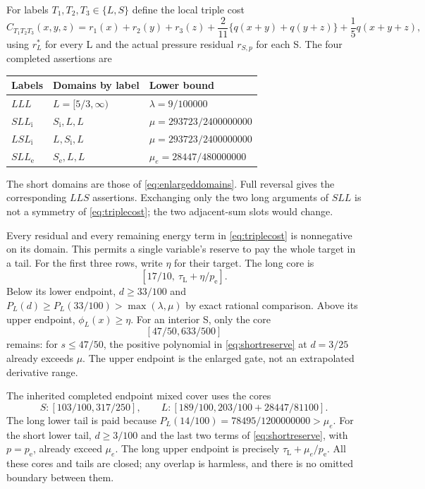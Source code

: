 \documentclass[11pt]{amsart}
\numberwithin{equation}{section}
\newcommand{\pe}{p_{\mathrm e}}
\newcommand{\tL}{\tau_{\mathrm L}}
\begin{document}
For labels $T_1,T_2,T_3\in\{L,S\}$ define the local triple cost
\begin{equation}\label{eq:triplecost}
 C_{T_1T_2T_3}(x,y,z)=r_1(x)+r_2(y)+r_3(z)
       +\frac2{11}\{q(x+y)+q(y+z)\}+\frac15q(x+y+z),
\end{equation}
using $r_L^*$ for every L and the actual pressure residual
$r_{S,p}$ for each S. The four completed assertions are
\begin{center}\small
\begin{tabular}{@{}lll@{}}
\toprule
Labels & Domains by label & Lower bound\\
\midrule
$LLL$ & $L=[5/3,\infty)$ & $\lambda=9/100000$\\
$SLL_{\mathrm i}$ & $S_{\mathrm i},L,L$ & $\mu=293723/2400000000$\\
$LSL_{\mathrm i}$ & $L,S_{\mathrm i},L$ & $\mu=293723/2400000000$\\
$SLL_{\mathrm e}$ & $S_{\mathrm e},L,L$ & $\mu_e=28447/480000000$\\
\bottomrule
\end{tabular}
\end{center}
The short domains are those of \eqref{eq:enlargeddomains}. Full
reversal gives the corresponding $LLS$ assertions. Exchanging only
the two long arguments of $SLL$ is not a symmetry of
\eqref{eq:triplecost}; the two adjacent-sum slots would change.

Every residual and every remaining energy term in
\eqref{eq:triplecost} is nonnegative on its domain. This permits a
single variable's reserve to pay the whole target in a tail. For
the first three rows, write $\eta$ for their target. The long core is
\begin{equation}\label{eq:newlongcore}
 [17/10,\ \tL+\eta/\pe].
\end{equation}
Below its lower endpoint, $d\geq33/100$ and
$P_L(d)\geq P_L(33/100)>\max(\lambda,\mu)$ by exact rational
comparison. Above its upper endpoint, $\phi_L(x)\geq\eta$.
For an interior S, only the core
\begin{equation}\label{eq:newshortcore}
 [47/50,633/500]
\end{equation}
remains: for $s\leq47/50$, the positive polynomial in
\eqref{eq:shortreserve} at $d=3/25$ already exceeds $\mu$.
The upper endpoint is the enlarged gate, not an extrapolated
derivative range.

The inherited completed endpoint mixed cover uses the cores
\begin{equation}\label{eq:endpointcores}
 S:[103/100,317/250],\qquad
 L:[189/100,203/100+28447/81100].
\end{equation}
The long lower tail is paid because
$P_L(14/100)=78495/1200000000>\mu_e$.
For the short lower tail, $d\geq3/100$ and the last two terms of
\eqref{eq:shortreserve}, with $p=\pe$, already exceed $\mu_e$.
The long upper endpoint is precisely $\tL+\mu_e/\pe$.
All these cores and tails are closed; any overlap is harmless, and
there is no omitted boundary between them.
\end{document}
